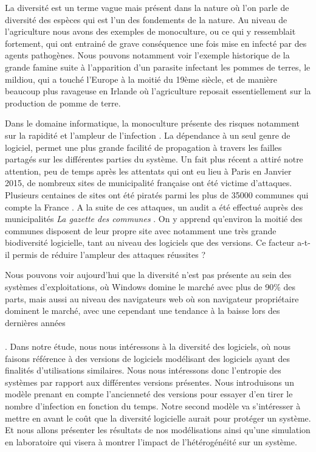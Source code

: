 La diversité est un terme vague mais présent dans la nature où l’on parle de diversité des espèces qui est l’un des fondements de la nature. Au niveau de l’agriculture nous avons des exemples de monoculture, ou ce qui y ressemblait fortement, qui ont entrainé de grave conséquence une fois mise en infecté par des agents pathogènes. Nous pouvons notamment voir l’exemple historique de la grande famine suite à l’apparition d’un parasite infectant les pommes de terres, le mildiou, qui a touché l’Europe à la moitié du 19ème siècle, et de manière beaucoup plus ravageuse en Irlande où l’agriculture reposait essentiellement sur la production de pomme de terre.

Dans le domaine informatique, la monoculture présente des risques notamment sur la rapidité et l’ampleur de l’infection \cite{risksOfMonoculture}. La dépendance à un seul genre de logiciel, permet une plus grande facilité de propagation à travers les failles partagés sur les différentes parties du système.
Un fait plus récent a attiré notre attention, peu de temps après les attentats qui ont eu lieu à Paris en Janvier 2015, de nombreux sites de municipalité française ont été victime d’attaques. Plusieurs centaines de sites ont été piratés parmi les plus de 35000 communes qui compte la France \cite{communes_INSEE}. A la suite de ces attaques, un audit a été effectué auprès des municipalités \textit{La gazette des communes} . On y apprend qu’environ la moitié des communes disposent de leur propre site avec notamment une très grande biodiversité logicielle, tant au niveau des logiciels que des versions. Ce facteur a-t-il permis de réduire l’ampleur des attaques réussites ?

Nous pouvons voir aujourd’hui que la diversité n’est pas présente au sein des systèmes d’exploitations, où Windows domine le marché avec plus de 90\% des parts, mais aussi au niveau des navigateurs web où son navigateur propriétaire dominent le marché, avec une cependant une tendance à la baisse lors des dernières années \\\\\cite{netMarketShare}. 
Dans notre étude, nous nous intéressons à la diversité des logiciels, où nous faisons référence à des versions de logiciels modélisant des logiciels ayant des finalités d’utilisations similaires. Nous nous intéressons donc l’entropie des systèmes par rapport aux différentes versions présentes. Nous introduisons un modèle prenant en compte l’ancienneté des versions pour essayer d’en tirer le nombre d’infection en fonction du temps. Notre second modèle va s’intéresser à mettre en avant le coût que la diversité logicielle aurait pour protéger un système. 
Et nous allons présenter les résultats de nos modélisations ainsi qu’une simulation en laboratoire qui visera à montrer l’impact de l’hétérogénéité sur un système.
